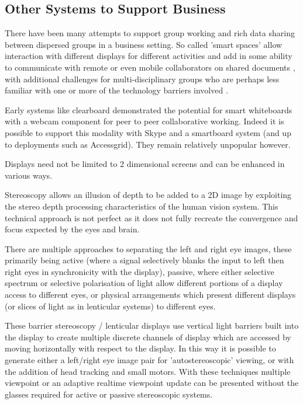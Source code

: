 \subsection{Other Systems to Support Business}                  
There have been many attempts to support group working and rich data sharing between dispersed groups in a business setting. So called 'smart spaces' allow interaction with different displays for different activities and add in some ability to communicate with remote or even mobile collaborators on shared documents \cite{Bardram2012}, with additional challenges for multi-disciplinary groups who are perhaps less familiar with one or more of the technology barriers involved \cite{Adamczyk2007}.\par
Early systems like clearboard \cite{Ishii1993} demonstrated the potential for smart whiteboards with a webcam component for peer to peer collaborative working. Indeed it is possible to support this modality with Skype and a smartboard system (and up to deployments such as Accessgrid). They remain relatively unpopular however.\par
Displays need not be limited to 2 dimensional screens and can be enhanced in various ways.\par
Stereoscopy allows an illusion of depth to be added to a 2D image by exploiting the stereo depth processing characteristics of the human vision system. This technical approach is not perfect as it does not fully recreate the convergence and focus expected by the eyes and brain.\par %
There are multiple approaches to separating the left and right eye images, these primarily being active (where a signal selectively blanks the input to left then right eyes in synchronicity with the display), passive, where either selective spectrum or selective polarisation of light allow different portions of a display access to different eyes, or physical arrangements which present different displays (or slices of light as in lenticular systems) to different eyes.\par
These barrier stereoscopy / lenticular displays use vertical light barriers built into the display to create multiple discrete channels of display which are accessed by moving horizontally with respect to the display. In this way it is possible to generate either a left/right eye image pair for 'autostereoscopic' viewing, or with the addition of head tracking and small motors. With these techniques multiple viewpoint or an adaptive realtime viewpoint update can be presented without the glasses required for active or passive stereoscopic systems. \par
